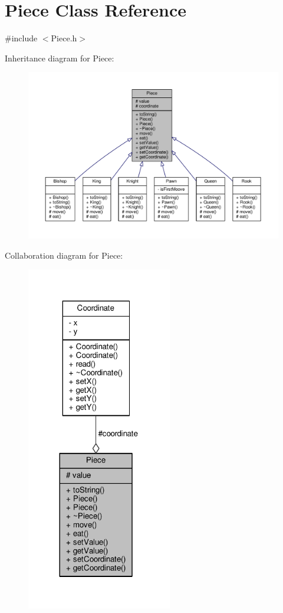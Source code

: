 \hypertarget{class_piece}{}\section{Piece Class Reference}
\label{class_piece}


{\ttfamily \#include $<$Piece.\+h$>$}



Inheritance diagram for Piece\+:
\nopagebreak
\begin{figure}[H]
\begin{center}
\leavevmode
\includegraphics[width=350pt]{class_piece__inherit__graph}
\end{center}
\end{figure}


Collaboration diagram for Piece\+:
\nopagebreak
\begin{figure}[H]
\begin{center}
\leavevmode
\includegraphics[width=180pt]{class_piece__coll__graph}
\end{center}
\end{figure}
